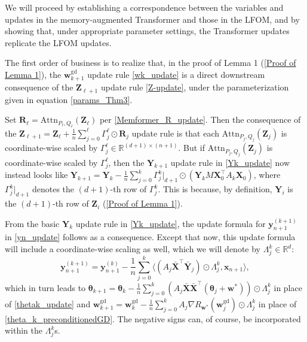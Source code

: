 \documentclass[11pt]{article}
\numberwithin{equation}{section}
\begin{document}
We will proceed by establishing a correspondence between the variables and updates in the memory-augmented Transformer and those in the LFOM, and by showing that, under appropriate parameter settings, the Transformer updates replicate the LFOM updates.

The first order of business is to realize that, in the proof of Lemma 1 (\ref{Proof of Lemma 1}), the \(\mathbf{w}_{k+1}^{\text{gd}}\) update rule \eqref{wk_update} is a direct downstream consequence of the \(\mathbf{Z}_{\ell+1}\) update rule \eqref{Z-update}, under the parameterization given in equation \eqref{params_Thm3}.

Set \(\mathbf{R}_\ell = \mathrm{Attn}_{P_\ell, Q_\ell}(\mathbf{Z}_\ell)\) per \eqref{Memformer_R_update}. Then the consequence of the \(\mathbf{Z}_{\ell+1} = \mathbf{Z}_\ell + \frac{1}{n} \sum_{j=0}^{\ell} \Gamma_j^\ell \odot \mathbf{R}_j\) update rule is that each \(\mathrm{Attn}_{P_j, Q_j}(\mathbf{Z}_j)\) is coordinate-wise scaled by \(\Gamma_j^\ell \in \mathbb{R}^{(d + 1) \times (n + 1)}\). But if \(\mathrm{Attn}_{P_j, Q_j}(\mathbf{Z}_j)\) is coordinate-wise scaled by \(\Gamma_j^\ell\), then the \(\mathbf{Y}_{k+1}\) update rule in \eqref{Yk_update} now instead looks like \(\mathbf{Y}_{k+1} = \mathbf{Y}_k - \frac{1}{n} \sum_{j=0}^{k} \Gamma_j^k \big|_{d+1} \odot (\mathbf{Y}_k M \mathbf{X}_0^\top A_k \mathbf{X}_0)\), where \(\Gamma_j^k \big|_{d+1}\) denotes the \((d + 1)\)-th row of \(\Gamma_j^k\). This is because, by definition, \(\mathbf{Y}_i\) is the \((d+1)\)-th row of \(\mathbf{Z}_i\) (\ref{Proof of Lemma 1}).

From the basic \(\mathbf{Y}_k\) update rule in \eqref{Yk_update}, the update formula for \(\mathbf{y}_{n+1}^{(k+1)}\) in \eqref{yn_update} follows as a consequence. Except that now, this update formula will include a coordinate-wise scaling as well, which we will denote by \(\Lambda_j^k \in \mathbb{R}^{d}\):
\[
\mathbf{y}_{n+1}^{(k+1)} = \mathbf{y}_{n+1}^{(k)} - \frac{1}{n} \sum_{j=0}^{k}\langle (A_j \mathbf{\bar{X}}^\top \mathbf{\bar{Y}}_j) \odot \Lambda_j^k, \mathbf{x}_{n+1} \rangle,
\label{scaled_yn_update}
\]
which in turn leads to \(\mathbf{\theta}_{k+1} = \mathbf{\theta}_k - \frac{1}{n} \sum_{j=0}^{k} (A_j \mathbf{\bar{X}} \mathbf{\bar{X}}^\top (\mathbf{\theta}_j + \mathbf{w}^*)) \odot \Lambda_j^k\) in place of \eqref{thetak_update} and \(\mathbf{w}_{k+1}^{\text{gd}} = \mathbf{w}_k^{\text{gd}} - \frac{1}{n} \sum_{j=0}^{k} A_j \nabla R_{\mathbf{w}^*}(\mathbf{w}_j^{\text{gd}}) \odot \Lambda_j^k\) in place of \eqref{theta_k_preconditionedGD}. The negative signs can, of course, be incorporated within the \(\Lambda_j^k\)s.
\end{document}
